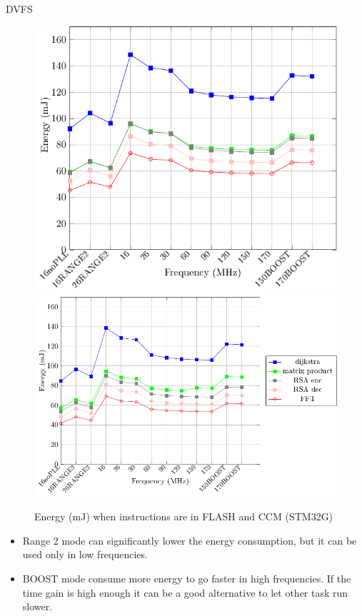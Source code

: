 \documentclass[
	11pt, %
]{beamer}
\begin{document}
\begin{frame}{DVFS}
	\begin{figure}
		\includegraphics[scale = 0.4]{data/stm32g_v2/abs/abs_energy_flash_32g.pdf}
		\includegraphics[scale = 0.4]{data/stm32g_v2/abs/abs_energy_ccm.pdf}
		\caption{Energy (mJ) when instructions are in FLASH and CCM (STM32G)}
	\end{figure}
	\begin{itemize}
		\item Range 2 mode can significantly lower the energy consumption, but it can be used only in low frequencies.
		\item BOOST mode consume more energy to go faster in high frequencies. If the time gain is high enough it can be a good alternative to let other task run slower. 
	\end{itemize}
\end{frame}
\end{document}
